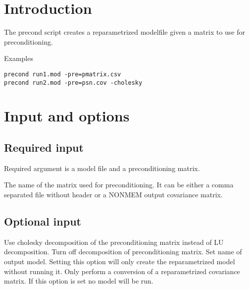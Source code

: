 



\maketitle


\section{Introduction}
The precond script creates a reparametrized modelfile given a matrix to use for preconditioning.

Examples
\begin{verbatim}
precond run1.mod -pre=pmatrix.csv
precond run2.mod -pre=psn.cov -cholesky 
\end{verbatim}

\section{Input and options}

\subsection{Required input}
Required argument is a model file and a preconditioning matrix.

\begin{optionlist}

The name of the matrix used for preconditioning. It can be either a comma separated file without header or a NONMEM output covariance matrix.
\nextopt
\end{optionlist}

\subsection{Optional input}

\begin{optionlist}
Use cholesky decomposition of the preconditioning matrix instead of LU decomposition.
Turn off decomposition of preconditioning matrix.
Set name of output model. Setting this option will only create the reparametrized model without running it.
Only perform a conversion of a reparametrized covariance matrix. If this option is set no model will be run.
\end{optionlist}

